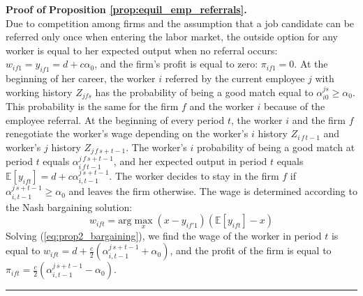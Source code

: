 \documentclass[12pt]{article}
\newenvironment{proof}[1][Proof of]{\noindent\textbf{#1} }{\ \rule{0.5em}{0.5em}}
\begin{document}
\begin{proof}
\textbf{Proposition \ref{prop:equil_emp_referrals}.}\\
Due to competition among firms and the assumption that a job candidate can be referred only once when entering the labor market, the outside option for any worker is equal to her expected output when no referral occurs: $w_{if1} = y_{if1}= d + c\alpha_{0}$, and the firm's profit is equal to zero: $\pi_{if1} = 0$. At the beginning of her career, the  worker $i$ referred by the current employee $j$ with working history $Z_{jfs}$ has the probability of being a good match equal to $\alpha_{i0}^{js}\geq \alpha_0$. This probability is the same for the firm $f$ and the worker $i$ because of the employee referral. 
At the beginning of every period $t$, the worker $i$ and the firm $f$ renegotiate the worker's wage depending on the worker's $i$ history $Z_{i\, f \, t-1}$ and worker's $j$ history $Z_{j\, f \, s+t-1}$. The worker's $i$ probability of being a good match at period $t$ equals $\alpha_{i\, f \, t-1}^{j\, f \, s+t-1}$, and her expected output in period $t$ equals $\mathbb{E}[y_{ift}] = d+c\alpha_{i,t-1}^{j\,s+t-1}$. The worker decides to stay in the firm $f$ if $\alpha_{i,t-1}^{j\,s+t-1} \geq \alpha_0$ and leaves the firm otherwise. The wage is determined according to the Nash bargaining solution:
\begin{equation}\label{eq:prop2_bargaining}
w_{ift} = \text{arg}\max_{x}(x-y_{if'1})(\mathbb{E}[y_{ift}]-x)
\end{equation}
Solving (\ref{eq:prop2_bargaining}), we find the wage of the worker in period $t$ is equal to $w_{ift} = d+\frac{c}{2}(\alpha_{i,t-1}^{j\,s+t-1}+\alpha_0)$, and the profit of the firm is equal to $\pi_{ift} = \frac{c}{2}(\alpha_{i,t-1}^{j\,s+t-1}-\alpha_0)$. 
\end{proof}
\end{document}

